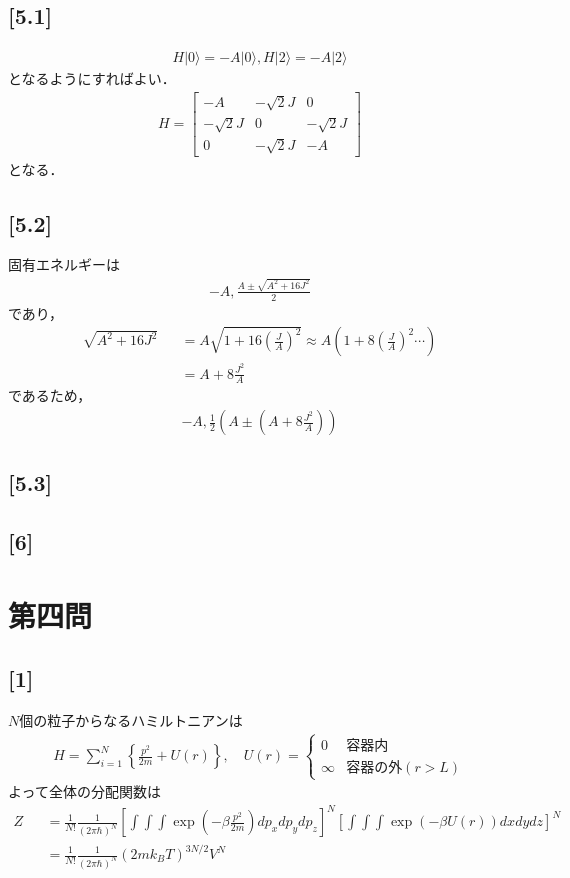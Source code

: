 \documentclass[12pt,dvipdfmx]{jsarticle}
\begin{document}
\subsection*{\large{[5.1]}}
\begin{eqnarray}
  H|0\rangle = -A|0\rangle, H|2\rangle = -A|2\rangle
\end{eqnarray}
となるようにすればよい．
\begin{eqnarray}
  H =
  \begin{bmatrix}
    -A & -\sqrt{2}J & 0\\
    -\sqrt{2}J & 0 & -\sqrt{2}J\\
    0 & -\sqrt{2}J & -A
  \end{bmatrix}
\end{eqnarray}
となる．
\subsection*{\large{[5.2]}}
固有エネルギーは
\begin{eqnarray}
  -A,\frac{A\pm \sqrt{A^2+16J^2}}{2} 
\end{eqnarray}
であり，
\begin{eqnarray}
  \sqrt{A^2+16J^2} &&= A\sqrt{ 1+16\left( \frac{J}{A} \right)^2 } \approx A\left( 1+8\left( \frac{J}{A} \right)^2 \cdots \right)\\
  &&= A+8\frac{J^2}{A}
\end{eqnarray}
であるため，
\begin{eqnarray}
  -A, \frac{1}{2}\left( A\pm \left(  A+8\frac{J^2}{A} \right) \right)
\end{eqnarray}
\subsection*{\large{[5.3]}}
\subsection*{\large{[6]}}
\newpage
\section*{\Large{第四問}}
\subsection*{\large{[1]}}

$N$個の粒子からなるハミルトニアンは
\begin{eqnarray}
  H = \sum_{i=1}^{N} \left\{ \frac{p^2}{2m} + U(r) \right\}, \quad U(r)=
  \begin{cases}
    0 & 容器内\\
    \infty & 容器の外(r>L)
  \end{cases}
\end{eqnarray}
よって全体の分配関数は
\begin{eqnarray}
  Z &&= \frac{1}{N!}\frac{1}{(2\pi\hbar)^N}\left[ \int\int\int \exp\left(-\beta\frac{p^2}{2m}\right)dp_x dp_y dp_z \right]^N \left[ \int\int\int \exp\left(-\beta U(r)\right)dx dydz \right]^N\\
  &&= \frac{1}{N!}\frac{1}{(2\pi\hbar)^N} (2mk_B T)^{3N/2} V^N
\end{eqnarray}
\end{document}
